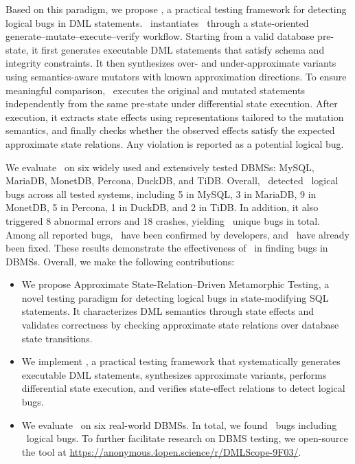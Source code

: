 Based on this paradigm, we propose \toolname, a practical testing framework for detecting logical bugs in DML statements. 
\toolname\ instantiates \model\ through a state-oriented generate--mutate--execute--verify workflow. 
Starting from a valid database pre-state, it first generates executable DML statements that satisfy schema and integrity constraints. 
It then synthesizes over- and under-approximate variants using semantics-aware mutators with known approximation directions. 
To ensure meaningful comparison, \toolname\ executes the original and mutated statements independently from the same pre-state under differential state execution. 
After execution, it extracts state effects using representations tailored to the mutation semantics, and finally checks whether the observed effects satisfy the expected approximate state relations. 
Any violation is reported as a potential logical bug.

We evaluate \toolname\ on six widely used and extensively tested DBMSs: MySQL, MariaDB, MonetDB, Percona, DuckDB, and TiDB.
Overall, \toolname\ detected \logical\ logical bugs across all tested systems, including 5 in MySQL, 3 in MariaDB, 9 in MonetDB, 5 in Percona, 1 in DuckDB, and 2 in TiDB. 
In addition, it also triggered 8 abnormal errors and 18 crashes, yielding \reported\ unique bugs in total. 
Among all reported bugs, \confirmed\ have been confirmed by developers, and \fixed\ have already been fixed. 
These results demonstrate the effectiveness of \toolname\ in finding bugs in DBMSs.
Overall, we make the following contributions:
\begin{itemize}[leftmargin=10pt]
	\item We propose Approximate State-Relation--Driven Metamorphic Testing, a novel testing paradigm for detecting logical bugs in state-modifying SQL statements. It characterizes DML semantics through state effects and validates correctness by checking approximate state relations over database state transitions.
	
	\item We implement \toolname, a practical testing framework that systematically generates executable DML statements, synthesizes approximate variants, performs differential state execution, and verifies state-effect relations to detect logical bugs.
	
	\item We evaluate \toolname\ on six real-world DBMSs. In total, we found \confirmed\ bugs including \logical\ logical bugs. To further facilitate research on DBMS testing, we open-source the tool at \url{https://anonymous.4open.science/r/DMLScope-9F03/}.  
\end{itemize}







